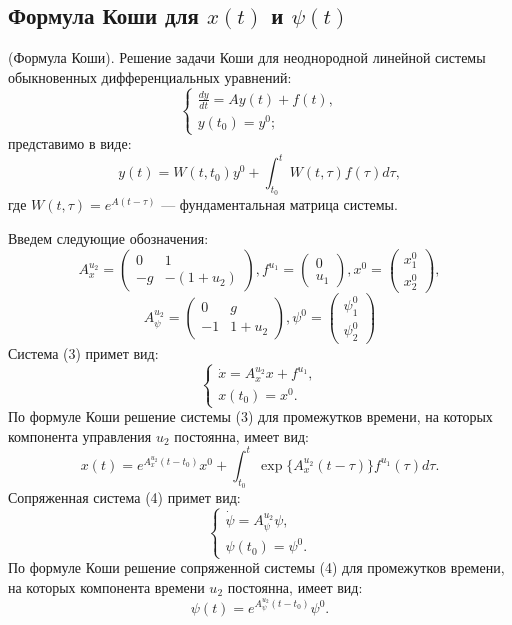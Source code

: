 \documentclass[11pt]{article}
\begin{document}
	\subsection{Формула Коши для $x(t)$ и $\psi(t)$}
	\begin{theorem}
		{(Формула Коши). Решение задачи Коши для неоднородной линейной системы обыкновенных дифференциальных уравнений:}
		\[ \begin{cases}
			\frac{dy}{dt} = Ay(t) + f(t),\\
			y(t_0) = y^0;
		\end{cases} \]
		{представимо в виде:}
		\[y(t) = W(t,t_0)y^0 + \int_{t_0}^{t} W(t,\tau) f(\tau)d\tau, \]
		{где $W(t,\tau) = e^{A(t - \tau)}$ --- фундаментальная матрица системы.}
	\end{theorem}
	{Введем следующие обозначения:}
	\[ A_x^{u_2}  = \left( \begin{matrix}
	0 & 1 \\
	-g & -(1 + u_2)
	\end{matrix} \right), f^{u_1} = \begin{pmatrix}
	0\\
	u_1
	\end{pmatrix}, x^0 = \begin{pmatrix}
	x_1^0\\
	x_2^0
	\end{pmatrix},  \]
	\[ A_\psi^{u_2} = \begin{pmatrix}
	0 & g \\
	-1 & 1 + u_2
	\end{pmatrix}, \psi^0 = \begin{pmatrix}
	\psi_1^0 \\
	\psi_2^0
	\end{pmatrix} \]
	{Система (3) примет вид:}
	\[ \begin{cases}
	\dot{x} = A_x^{u_2}x + f^{u_1}, \\
	x(t_0) = x^0.
	\end{cases} \]
	{По формуле Коши решение системы (3) для промежутков времени, на которых компонента управления $u_2$ постоянна, имеет вид:}
	\begin{equation}
	x(t) = e^{A_x^{u_2}(t - t_0)}x^0 + \int_{t_0}^{t}\exp\{A_x^{u_2}(t - \tau)\}f^{u_1}(\tau)d\tau.
	\end{equation}
	{Сопряженная система (4) примет вид:}
	\[ \begin{cases}
	\dot{\psi} = A_\psi^{u_2}\psi,\\
	\psi(t_0) = \psi^0.
	\end{cases} \]
	{По формуле Коши решение сопряженной системы (4) для промежутков времени, на которых компонента времени $u_2$ постоянна, имеет вид:}
	\begin{equation}
	\psi(t) = e^{A_\psi^{u_2}(t - t_0)}\psi^0.
	\end{equation}
	
\end{document}
